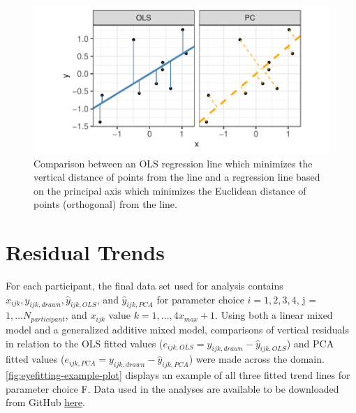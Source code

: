 \begin{appendix}
\begin{figure}

{\centering \includegraphics[width=0.9\linewidth]{./images/ols-vs-pca-example-1} 

}

\caption{ Comparison between an OLS regression line which minimizes the vertical distance of points from the line and a regression line based on the principal axis which minimizes the Euclidean distance of points (orthogonal) from the line.}\label{fig:ols-vs-pca-example}
\end{figure}

\hypertarget{residual-trends}{%
\section{\texorpdfstring{Residual Trends
\label{app:residual-trends}}{Residual Trends }}\label{residual-trends}}

For each participant, the final data set used for analysis contains
\(x_{ijk}, y_{ijk,drawn}, \hat y_{ijk,OLS}\), and \(\hat y_{ijk,PCA}\)
for parameter choice \(i = 1,2,3,4\), j = \(1,...N_{participant}\), and
\(x_{ijk}\) value \(k = 1, ...,4 x_{max} + 1\). Using both a linear
mixed model and a generalized additive mixed model, comparisons of
vertical residuals in relation to the OLS fitted values
(\(e_{ijk,OLS} = y_{ijk,drawn} - \hat y_{ijk,OLS}\)) and PCA fitted
values (\(e_{ijk,PCA} = y_{ijk,drawn} - \hat y_{ijk,PCA}\)) were made
across the domain. \cref{fig:eyefitting-example-plot} displays an
example of all three fitted trend lines for parameter choice F. Data
used in the analyses are available to be downloaded from GitHub
\href{https://github.com/earobinson95/Eye-Fitting-Straight-Lines-in-the-Modern-Era/raw/main/data/youdrawit-eyefitting-model-data.csv}{here}.

\begin{figure}


\end{figure}
\end{appendix}
